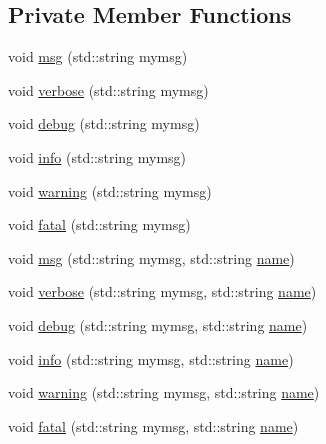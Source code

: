 \subsection*{Private Member Functions}
\begin{DoxyCompactItemize}
\item 
void \hyperlink{classDLL_a3a4774ae240e805b9c3ce18b7418d7cc}{msg} (std\+::string mymsg)
\item 
void \hyperlink{classDLL_a3b019cc98993af67fdc9b07b1921251b}{verbose} (std\+::string mymsg)
\item 
void \hyperlink{classDLL_ab3fb4a13b4308047d42b27b6943a47da}{debug} (std\+::string mymsg)
\item 
void \hyperlink{classDLL_a2b7ea0c85b83a1dec03e4fce13c0d5d2}{info} (std\+::string mymsg)
\item 
void \hyperlink{classDLL_a4bbc341bad623eedb5c228c91ce2e858}{warning} (std\+::string mymsg)
\item 
void \hyperlink{classDLL_a946b5d7e4b0b200b7acf190aa58bf9c4}{fatal} (std\+::string mymsg)
\item 
void \hyperlink{classDLL_a39585579e6dd045ee39cd74ebecc0525}{msg} (std\+::string mymsg, std\+::string \hyperlink{classDLL_a0a915d538771dde2cb0580cd340ee088}{name})
\item 
void \hyperlink{classDLL_a721fa58107b11bb96181219f06f517e3}{verbose} (std\+::string mymsg, std\+::string \hyperlink{classDLL_a0a915d538771dde2cb0580cd340ee088}{name})
\item 
void \hyperlink{classDLL_a681470b03d31aab77229bb2e3a72409c}{debug} (std\+::string mymsg, std\+::string \hyperlink{classDLL_a0a915d538771dde2cb0580cd340ee088}{name})
\item 
void \hyperlink{classDLL_ac7c5b201c76267167f3543d524d06046}{info} (std\+::string mymsg, std\+::string \hyperlink{classDLL_a0a915d538771dde2cb0580cd340ee088}{name})
\item 
void \hyperlink{classDLL_a0f7d876098d5dcd412989a3b2a5dadf3}{warning} (std\+::string mymsg, std\+::string \hyperlink{classDLL_a0a915d538771dde2cb0580cd340ee088}{name})
\item 
void \hyperlink{classDLL_ada1bec81505d4e419e995004a2eb180e}{fatal} (std\+::string mymsg, std\+::string \hyperlink{classDLL_a0a915d538771dde2cb0580cd340ee088}{name})
\end{DoxyCompactItemize}
